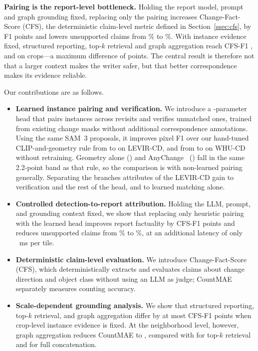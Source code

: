\textbf{Pairing is the report-level bottleneck.} Holding the report model,
prompt and graph grounding fixed, replacing only the pairing increases
Change-Fact-Score (CFS), the deterministic claim-level metric defined in
Section~\ref{ssec:cfs}, by \EFiveGain{} F1 points and lowers unsupported claims
from \EFiveHeuristicHal\% to \EFiveLearnedHal\%. With instance evidence fixed,
structured reporting, top-$k$ retrieval and graph aggregation reach CFS-F1
\EFourStructFOne{}, \EFourFlatRagFOne{} and \EFourGraphRAGFOne{} on
\EFourNCrops{} crops---a maximum difference of \EFourLadderExactSpread{}
points. The central result is therefore not that a larger context makes the
writer safer, but that better correspondence makes its evidence reliable.

Our contributions are as follows.

\begin{itemize}
\item \textbf{Learned instance pairing and verification.} We introduce a
      \HeadParamsRound-parameter head that pairs instances across revisits and
      verifies unmatched ones, trained from existing change masks without
      additional correspondence annotations. Using the same SAM~3 proposals, it
      improves pixel F1 over our hand-tuned CLIP-and-geometry rule from
      \EOneHeuristicFOne{} to \EOnePixelFOne{} on LEVIR-CD, and from
      \ETwoHeuristicFOne{} to \ETwoPixelFOne{} on WHU-CD without retraining.
      Geometry alone (\EOneGeoFOne) and AnyChange~\cite{zheng2024segment}
      (\AnyChangeFOne) fall in the same 2.2-point band as that rule, so the
      comparison is with non-learned pairing generally. Separating the branches
      attributes \EOneSuppressionGain{} of the LEVIR-CD gain to verification
      and the rest of the head, and \EOneMatchGain{} to learned matching alone.
\item \textbf{Controlled detection-to-report attribution.} Holding the LLM,
      prompt, and grounding context fixed, we show that replacing only
      heuristic pairing with the learned head improves report factuality by
      \EFiveGain{} CFS-F1 points and reduces unsupported claims from
      \EFiveHeuristicHal\% to \EFiveLearnedHal\%, at an additional latency of
      only \ESixHeadDelta~ms per tile.
\item \textbf{Deterministic claim-level evaluation.} We introduce
      Change-Fact-Score (CFS), which deterministically extracts and evaluates
      claims about change direction and object class without using an LLM as
      judge; CountMAE separately measures counting accuracy.
\item \textbf{Scale-dependent grounding analysis.} We show that structured
      reporting, top-$k$ retrieval, and graph aggregation differ by at most
      \EFourLadderExactSpread{} CFS-F1 points when crop-level instance evidence
      is fixed. At the neighborhood level, however, graph aggregation reduces
      CountMAE to \ESevenGraphCountMAE, compared with \ESevenFlatCountMAE{} for
      top-$k$ retrieval and \ESevenStructCountMAE{} for full concatenation.
\end{itemize}

